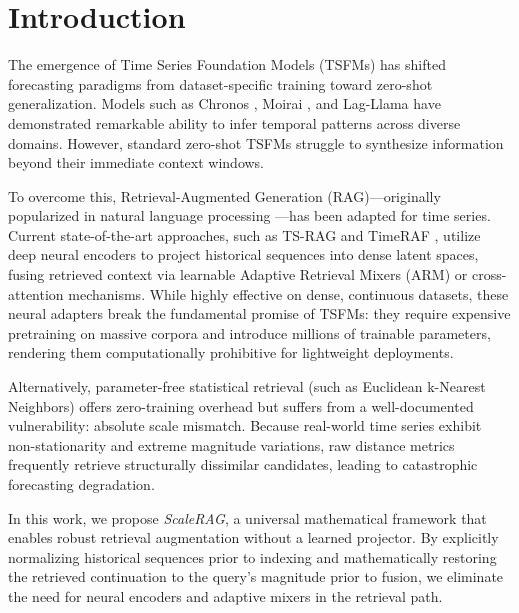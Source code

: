 \documentclass[twocolumn]{svjour3}          %
\begin{document}
\section{Introduction}
\label{sec:introduction}

The emergence of Time Series Foundation Models (TSFMs) has shifted forecasting paradigms from dataset-specific training toward zero-shot generalization. Models such as Chronos \cite{chronos}, Moirai \cite{moirai}, and Lag-Llama \cite{lagllama} have demonstrated remarkable ability to infer temporal patterns across diverse domains. However, standard zero-shot TSFMs struggle to synthesize information beyond their immediate context windows.

To overcome this, Retrieval-Augmented Generation (RAG)---originally popularized in natural language processing \cite{rag}---has been adapted for time series. Current state-of-the-art approaches, such as TS-RAG \cite{tsrag} and TimeRAF \cite{timeraf}, utilize deep neural encoders to project historical sequences into dense latent spaces, fusing retrieved context via learnable Adaptive Retrieval Mixers (ARM) or cross-attention mechanisms. While highly effective on dense, continuous datasets, these neural adapters break the fundamental promise of TSFMs: they require expensive pretraining on massive corpora and introduce millions of trainable parameters, rendering them computationally prohibitive for lightweight deployments.

Alternatively, parameter-free statistical retrieval (such as Euclidean k-Nearest Neighbors) offers zero-training overhead but suffers from a well-documented vulnerability: absolute scale mismatch. Because real-world time series exhibit non-stationarity and extreme magnitude variations, raw distance metrics frequently retrieve structurally dissimilar candidates, leading to catastrophic forecasting degradation.

In this work, we propose \textit{ScaleRAG}, a universal mathematical framework that enables robust retrieval augmentation without a learned projector. By explicitly normalizing historical sequences prior to indexing and mathematically restoring the retrieved continuation to the query's magnitude prior to fusion, we eliminate the need for neural encoders and adaptive mixers in the retrieval path.
\end{document}
